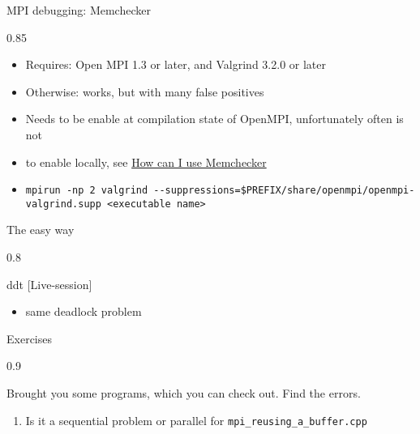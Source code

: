 \documentclass[aspectratio=1610]{beamer}
\newenvironment{centeredblock}[2][0.8\textwidth]
{ %
	\begin{center}
		\begin{varwidth}{#1} %
			\begin{block}{#2}
				\centering
			}
			{ %
			\end{block}
		\end{varwidth}
	\end{center}
}
\begin{document}
	\begin{frame}[fragile]{MPI debugging: Memchecker}
		\begin{centeredblock}[0.85 \textwidth]{}
			\begin{itemize}
				\item Requires: Open MPI 1.3 or later, and Valgrind 3.2.0 or later
				\item Otherwise: works, but with many false positives
				\item Needs to be enable at compilation state of OpenMPI, unfortunately often is not
				\item to enable locally, see \href{https://www.open-mpi.org/faq/?category=debugging#memchecker}{How can I use Memchecker}
				\item \begin{verbatim}
mpirun -np 2 valgrind --suppressions=$PREFIX/share/openmpi/openmpi-valgrind.supp <executable name>
				\end{verbatim}
			\end{itemize}
		\end{centeredblock}
	\end{frame}
	
	\begin{frame}[fragile]{The easy way}
		\begin{centeredblock}{ddt [Live-session]}
			\begin{itemize}
				\item same deadlock problem	
			\end{itemize}
		\end{centeredblock}
	\end{frame}
	
	
	\begin{frame}[fragile]{Exercises}
		\begin{centeredblock}[0.9 \textwidth]{}
			Brought you some programs, which you can check out. Find the errors.
			\begin{enumerate}

				\item Is it a sequential problem or parallel for \texttt{mpi\_reusing\_a\_buffer.cpp}
			\end{enumerate}
		\end{centeredblock}
	\end{frame}
\end{document}
